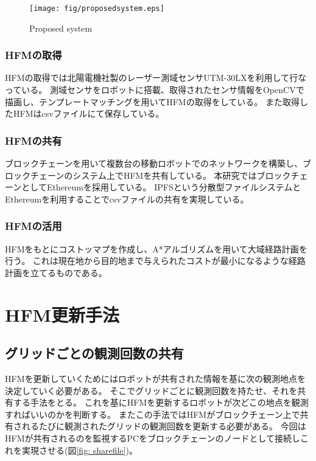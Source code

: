 \documentclass{jsarticle}
\begin{document}
\begin{figure}[tbh]
 \centering
  \texttt{[image: fig/proposedsystem.eps]}
  \vspace*{-4mm}
  \caption{Proposed system}
  \label{fig: proposedsystem}
\end{figure}

\subsubsection{HFMの取得}
HFMの取得では北陽電機社製のレーザー測域センサUTM-30LXを利用して行なっている。
測域センサをロボットに搭載、取得されたセンサ情報をOpenCVで描画し、テンプレートマッチングを用いてHFMの取得をしている。
また取得したHFMはcsvファイルにて保存している。

\subsubsection{HFMの共有}
ブロックチェーンを用いて複数台の移動ロボットでのネットワークを構築し、ブロックチェーンのシステム上でHFMを共有している。
本研究ではブロックチェーンとしてEthereumを採用している。
IPFSという分散型ファイルシステムとEthereumを利用することでcsvファイルの共有を実現している。


\subsubsection{HFMの活用}
HFMをもとにコストッマプを作成し、A*アルゴリズムを用いて大域経路計画を行う。
これは現在地から目的地まで与えられたコストが最小になるような経路計画を立てるものである。



\section{HFM更新手法}
\subsection{グリッドごとの観測回数の共有}
HFMを更新していくためにはロボットが共有された情報を基に次の観測地点を決定していく必要がある。
そこでグリッドごとに観測回数を持たせ、それを共有する手法をとる。
これを基にHFMを更新するロボットが次どこの地点を観測すればいいのかを判断する。
またこの手法ではHFMがブロックチェーン上で共有されるたびに観測されたグリッドの観測回数を更新する必要がある。
今回はHFMが共有されるのを監視するPCをブロックチェーンのノードとして接続しこれを実現させる(図\ref{fig: sharefile})。
\end{document}
